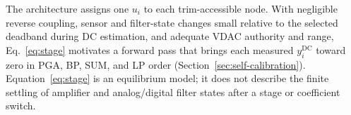 The architecture assigns one $u_i$ to each trim-accessible node. With negligible reverse coupling, sensor and filter-state changes small relative to the selected deadband during DC estimation, and adequate VDAC authority and range, Eq.~\ref{eq:stage} motivates a forward pass that brings each measured $y_i^{\mathrm{DC}}$ toward zero in PGA, BP, SUM, and LP order (Section~\ref{sec:self-calibration}). Equation~\ref{eq:stage} is an equilibrium model; it does not describe the finite settling of amplifier and analog/digital filter states after a stage or coefficient switch.
